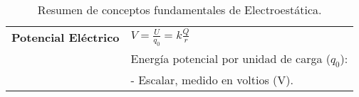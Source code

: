 \begin{table}[h]
\begin{tabular}{|>{\bfseries}l|l|}
        \textbf{Potencial Eléctrico} & 
        $V = \frac{U}{q_0} = k \frac{Q}{r}$ \\
        & Energía potencial por unidad de carga ($q_0$): \\
        & - Escalar, medido en voltios (V). \\ \hline
    \end{tabular}
    \caption{Resumen de conceptos fundamentales de Electroestática.}
    \label{tab:electrostatica}
\end{table}